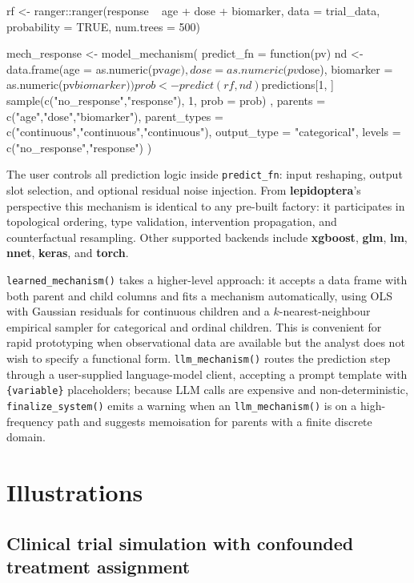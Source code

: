 \documentclass[12pt]{article}
\newcommand{\pkg}[1]{\textbf{#1}}
\newcommand{\code}[1]{\texttt{#1}}
\newcommand{\fct}[1]{\texttt{#1()}}
\begin{document}
\begin{CodeInput}
rf <- ranger::ranger(response ~ age + dose + biomarker,
                     data = trial_data, probability = TRUE,
                     num.trees = 500)

mech_response <- model_mechanism(
  predict_fn   = function(pv) {
    nd   <- data.frame(age       = as.numeric(pv$age),
                       dose      = as.numeric(pv$dose),
                       biomarker = as.numeric(pv$biomarker))
    prob <- predict(rf, nd)$predictions[1, ]
    sample(c("no_response","response"), 1, prob = prob)
  },
  parents      = c("age","dose","biomarker"),
  parent_types = c("continuous","continuous","continuous"),
  output_type  = "categorical",
  levels       = c("no_response","response")
)
\end{CodeInput}

\noindent
The user controls all prediction logic inside \code{predict\_fn}: input reshaping,
output slot selection, and optional residual noise injection. From \pkg{lepidoptera}'s
perspective this mechanism is identical to any pre-built factory: it participates
in topological ordering, type validation, intervention propagation, and
counterfactual resampling. Other supported backends include \pkg{xgboost},
\pkg{glm}, \pkg{lm}, \pkg{nnet}, \pkg{keras}, and \pkg{torch}.

\fct{learned\_mechanism} takes a higher-level approach: it accepts a data frame
with both parent and child columns and fits a mechanism automatically, using OLS
with Gaussian residuals for continuous children and a $k$-nearest-neighbour
empirical sampler for categorical and ordinal children. This is convenient for
rapid prototyping when observational data are available but the analyst does not
wish to specify a functional form. \fct{llm\_mechanism} routes the prediction step
through a user-supplied language-model client, accepting a prompt template with
\code{\{variable\}} placeholders; because LLM calls are expensive and
non-deterministic, \fct{finalize\_system} emits a warning when an
\fct{llm\_mechanism} is on a high-frequency path and suggests memoisation for
parents with a finite discrete domain.

\section{Illustrations}
\label{sec:illustrations}

\subsection{Clinical trial simulation with confounded treatment assignment}
\end{document}
